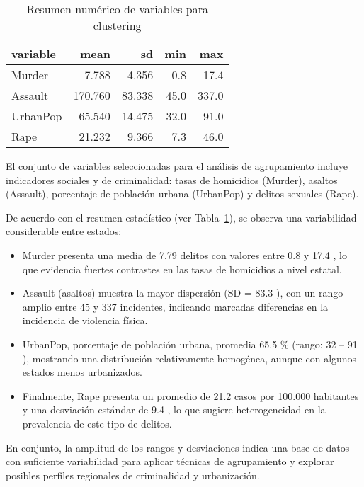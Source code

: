 \documentclass[
  spanish,
  11pt,
  a4paper,
  DIV=11,
  numbers=noendperiod]{scrartcl}
\begin{document}
\begin{longtable}[]{@{}lrrrr@{}}

\caption{\label{tbl-clust-prep}Resumen numérico de variables para
clustering}

\tabularnewline

\toprule\noalign{}
variable & mean & sd & min & max \\
\midrule\noalign{}
\endhead
\bottomrule\noalign{}
\endlastfoot
Murder & 7.788 & 4.356 & 0.8 & 17.4 \\
Assault & 170.760 & 83.338 & 45.0 & 337.0 \\
UrbanPop & 65.540 & 14.475 & 32.0 & 91.0 \\
Rape & 21.232 & 9.366 & 7.3 & 46.0 \\

\end{longtable}

El conjunto de variables seleccionadas para el análisis de agrupamiento
incluye indicadores sociales y de criminalidad: tasas de homicidios
(Murder), asaltos (Assault), porcentaje de población urbana (UrbanPop) y
delitos sexuales (Rape).

De acuerdo con el resumen estadístico (ver Tabla~\ref{tbl-clust-prep}),
se observa una variabilidad considerable entre estados:

\begin{itemize}
\item
  Murder presenta una media de 7.79 delitos con valores entre 0.8 y 17.4
  , lo que evidencia fuertes contrastes en las tasas de homicidios a
  nivel estatal.
\item
  Assault (asaltos) muestra la mayor dispersión (SD = 83.3 ), con un
  rango amplio entre 45 y 337 incidentes, indicando marcadas diferencias
  en la incidencia de violencia física.
\item
  UrbanPop, porcentaje de población urbana, promedia 65.5 \% (rango: 32
  -- 91 ), mostrando una distribución relativamente homogénea, aunque
  con algunos estados menos urbanizados.
\item
  Finalmente, Rape presenta un promedio de 21.2 casos por 100.000
  habitantes y una desviación estándar de 9.4 , lo que sugiere
  heterogeneidad en la prevalencia de este tipo de delitos.
\end{itemize}

En conjunto, la amplitud de los rangos y desviaciones indica una base de
datos con suficiente variabilidad para aplicar técnicas de agrupamiento
y explorar posibles perfiles regionales de criminalidad y urbanización.
\end{document}
